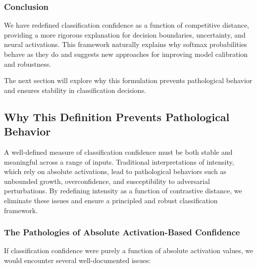 \documentclass[12pt]{article}
\begin{document}
\subsubsection{Conclusion}

We have redefined classification confidence as a function of competitive distance, providing a more rigorous explanation for decision boundaries, uncertainty, and neural activations. This framework naturally explains why softmax probabilities behave as they do and suggests new approaches for improving model calibration and robustness.

The next section will explore why this formulation prevents pathological behavior and ensures stability in classification decisions.

\subsection{Why This Definition Prevents Pathological Behavior}

A well-defined measure of classification confidence must be both stable and meaningful across a range of inputs. Traditional interpretations of intensity, which rely on absolute activations, lead to pathological behaviors such as unbounded growth, overconfidence, and susceptibility to adversarial perturbations. By redefining intensity as a function of contrastive distance, we eliminate these issues and ensure a principled and robust classification framework.

\subsubsection{The Pathologies of Absolute Activation-Based Confidence}

If classification confidence were purely a function of absolute activation values, we would encounter several well-documented issues:
\end{document}
